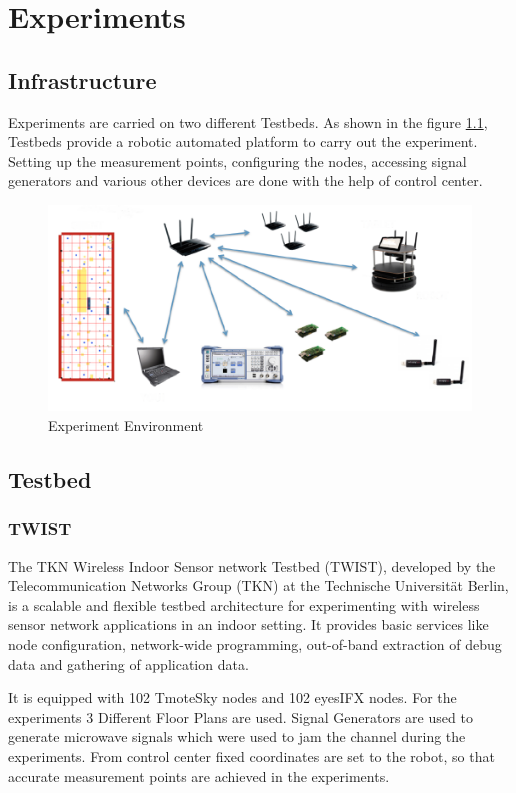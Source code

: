 \documentclass[11pt,a4paper,headinclude,footinclude,chapterprefix=on]{scrreprt}
\begin{document}
\chapter{Experiments} 
\section{Infrastructure} Experiments are carried on two different Testbeds. As shown in the figure \ref{fig:experiment}, Testbeds provide a robotic automated platform to carry out the experiment. Setting up the measurement points, configuring the nodes, accessing signal generators and various other devices are done with the help of control center. 
\begin{figure}
	[!h] \centering 
	\includegraphics[width=13cm]{Images/evari.png} \caption{Experiment Environment} \label{fig:experiment} 
\end{figure}

\section{Testbed} 
\subsection{TWIST} The TKN Wireless Indoor Sensor network Testbed (TWIST), developed by the Telecommunication Networks Group (TKN) at the Technische Universität Berlin, is a scalable and flexible testbed architecture for experimenting with wireless sensor network applications in an indoor setting. It provides basic services like node configuration, network-wide programming, out-of-band extraction of debug data and gathering of application data.

It is equipped with 102 TmoteSky nodes and 102 eyesIFX nodes. For the experiments 3 Different Floor Plans are used. Signal Generators are used to generate microwave signals which were used to jam the channel during the experiments. From control center fixed coordinates are set to the robot, so that accurate measurement points are achieved in the experiments. 
\end{document}
